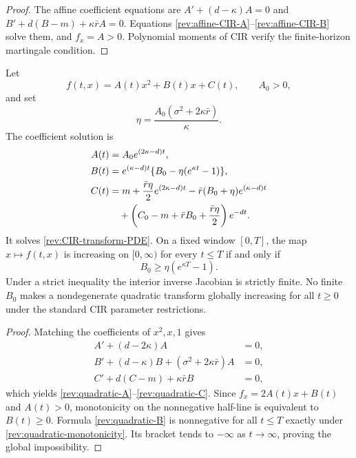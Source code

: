\begin{proof}
The affine coefficient equations are
$A'+(d-\kappa)A=0$ and
$B'+d(B-m)+\kappa\bar r A=0$.  Equations
\eqref{rev:affine-CIR-A}--\eqref{rev:affine-CIR-B} solve them, and $f_x=A>0$.
Polynomial moments of CIR verify the finite-horizon martingale condition.
\end{proof}

\begin{proposition}
\label{rev:prop-quadratic-CIR}
Let
\begin{equation}
f(t,x)=A(t)x^2+B(t)x+C(t),\qquad A_0>0,
\label{rev:quadratic-CIR-transform}
\end{equation}
and set
\begin{equation}
\eta=\frac{A_0(\sigma^2+2\kappa\bar r)}{\kappa}.
\label{rev:quadratic-eta}
\end{equation}
The coefficient solution is
\begin{align}
A(t)&=A_0e^{(2\kappa-d)t},\label{rev:quadratic-A}\\
B(t)&=e^{(\kappa-d)t}
      \{B_0-\eta(e^{\kappa t}-1)\},\label{rev:quadratic-B}\\
C(t)&=m+\frac{\bar r\eta}{2}e^{(2\kappa-d)t}
-\bar r(B_0+\eta)e^{(\kappa-d)t}
\notag\\
&\quad+
\left(C_0-m+\bar rB_0+\frac{\bar r\eta}{2}\right)e^{-dt}.
\label{rev:quadratic-C}
\end{align}
It solves \eqref{rev:CIR-transform-PDE}.  On a fixed window $[0,T]$, the map
$x\mapsto f(t,x)$ is increasing on $[0,\infty)$ for every $t\le T$ if and only if
\begin{equation}
B_0\ge\eta(e^{\kappa T}-1).
\label{rev:quadratic-monotonicity}
\end{equation}
Under a strict inequality the interior inverse Jacobian is strictly finite.
No finite $B_0$ makes a nondegenerate quadratic transform globally increasing
for all $t\ge0$ under the standard CIR parameter restrictions.
\end{proposition}

\begin{proof}
Matching the coefficients of $x^2,x,1$ gives
\begin{align*}
A'+(d-2\kappa)A&=0,\\
B'+(d-\kappa)B+(\sigma^2+2\kappa\bar r)A&=0,\\
C'+d(C-m)+\kappa\bar r B&=0,
\end{align*}
which yields \eqref{rev:quadratic-A}--\eqref{rev:quadratic-C}.  Since
$f_x=2A(t)x+B(t)$ and $A(t)>0$, monotonicity on the nonnegative half-line is
equivalent to $B(t)\ge0$.  Formula \eqref{rev:quadratic-B} is nonnegative for
all $t\le T$ exactly under \eqref{rev:quadratic-monotonicity}.  Its bracket
tends to $-\infty$ as $t\to\infty$, proving the global impossibility.
\end{proof}

